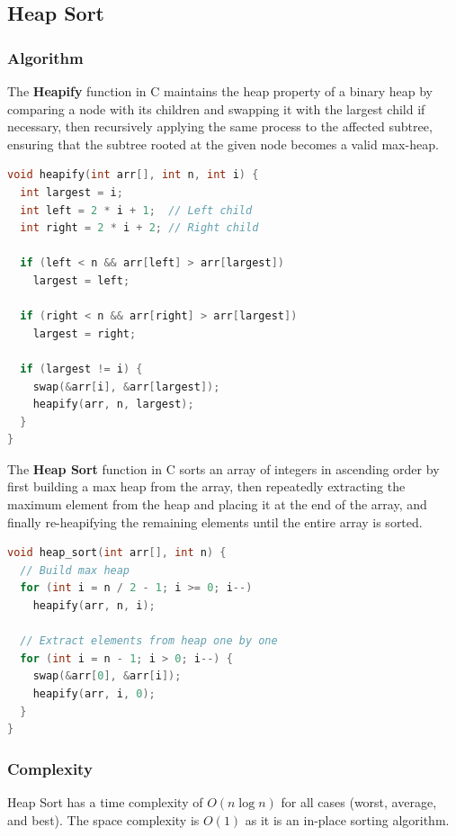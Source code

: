 \documentclass{article}
\begin{document}
\subsection{Heap Sort}

\subsubsection{Algorithm}
The \textbf{Heapify} function in C maintains the heap property of a binary heap by comparing a node with its children and swapping it with the largest child if necessary, then recursively applying the same process to the affected subtree, ensuring that the subtree rooted at the given node becomes a valid max-heap.

\newpage
\begin{lstlisting}[language=C, caption=Heapify implementation]
void heapify(int arr[], int n, int i) {
  int largest = i;
  int left = 2 * i + 1;  // Left child
  int right = 2 * i + 2; // Right child

  if (left < n && arr[left] > arr[largest])
    largest = left;

  if (right < n && arr[right] > arr[largest])
    largest = right;

  if (largest != i) {
    swap(&arr[i], &arr[largest]);
    heapify(arr, n, largest);
  }
}
\end{lstlisting}

The \textbf{Heap Sort} function in C sorts an array of integers in ascending order by first building a max heap from the array, then repeatedly extracting the maximum element from the heap and placing it at the end of the array, and finally re-heapifying the remaining elements until the entire array is sorted.

\begin{lstlisting}[language=C, caption=Heap Sort implementation]
void heap_sort(int arr[], int n) {
  // Build max heap
  for (int i = n / 2 - 1; i >= 0; i--)
    heapify(arr, n, i);

  // Extract elements from heap one by one
  for (int i = n - 1; i > 0; i--) {
    swap(&arr[0], &arr[i]);
    heapify(arr, i, 0);
  }
}
\end{lstlisting}

\subsubsection{Complexity}
Heap Sort has a time complexity of $O(n \log n)$ for all cases (worst, average, and best). The space complexity is $O(1)$ as it is an in-place sorting algorithm.
\end{document}
